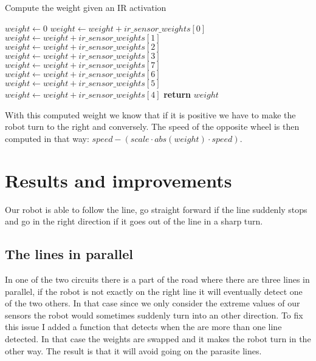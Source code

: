 \FloatBarrier
\begin{algorithm}
    \caption{Compute the weight given an IR activation}
    \label{compute_ir_weight}
    \begin{algorithmic}[1]
            \State $weight \gets 0$
                \State $weight \gets weight + ir\_sensor\_weights[0]$
                \State $weight \gets weight + ir\_sensor\_weights[1]$
                \State $weight \gets weight + ir\_sensor\_weights[2]$
                \State $weight \gets weight + ir\_sensor\_weights[3]$
            \EndIf
                \State $weight \gets weight + ir\_sensor\_weights[7]$
                \State $weight \gets weight + ir\_sensor\_weights[6]$
                \State $weight \gets weight + ir\_sensor\_weights[5]$
                \State $weight \gets weight + ir\_sensor\_weights[4]$
            \EndIf
            \State \textbf{return} $weight$
        \EndProcedure
    \end{algorithmic}
\end{algorithm}
\FloatBarrier

With this computed weight we know that if it is positive we have to make the robot turn to the right and conversely.
The speed of the opposite wheel is then computed in that way: $speed - (scale \cdot abs(weight) \cdot speed)$.

\section*{Results and improvements}

Our robot is able to follow the line, go straight forward if the line suddenly stops and go in the right direction if it goes out of the line in a sharp turn.


\subsection*{The lines in parallel}

In one of the two circuits there is a part of the road where there are three lines in parallel, if the robot is not exactly on the right line it will eventually detect one of the two others.
In that case since we only consider the extreme values of our sensors the robot would sometimes suddenly turn into an other direction.
To fix this issue I added a function that detects when the are more than one line detected.
In that case the weights are swapped and it makes the robot turn in the other way.
The result is that it will avoid going on the parasite lines.

